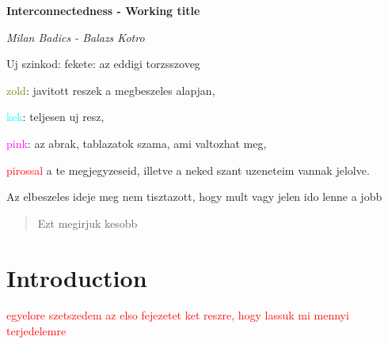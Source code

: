 \documentclass[12pt,bibliography=totoc]{article}
\begin{document}
\begin{titlepage}




 \begin{center}
\Huge\textbf{Interconnectedness - Working title}\\
 
\vspace{3cm}


 \Large\textit{Milan Badics - Balazs Kotro}
 
 \vspace{4cm}
Uj szinkod: fekete: az eddigi torzsszoveg

\textcolor{olive}{zold}: javitott reszek a megbeszeles alapjan,

\textcolor{cyan}{kek}: teljesen uj resz,

\textcolor{magenta}{pink}: az abrak, tablazatok szama, ami valtozhat meg,

\textcolor{red}{pirossal} a te megjegyzeseid, illetve a neked szant uzeneteim vannak jelolve.

Az elbeszeles ideje meg nem tisztazott, hogy mult vagy jelen ido lenne a jobb
\vspace{4cm}
\end{center}

\begin{abstract}
Ezt megirjuk kesobb
\end{abstract}


\end{titlepage}

\newpage

\section{Introduction}

\textcolor{red}{egyelore szetszedem az elso fejezetet ket reszre, hogy lassuk mi mennyi terjedelemre}
\end{document}

